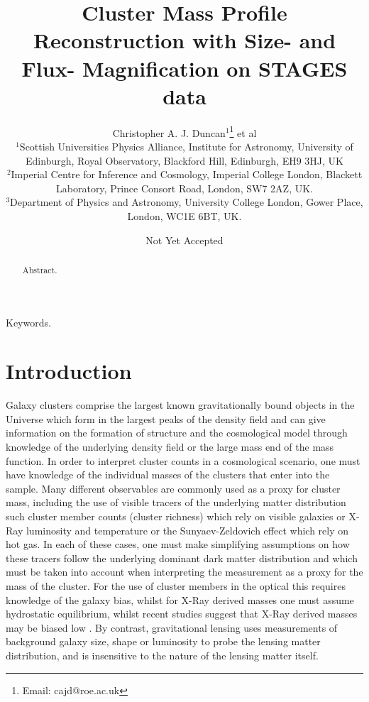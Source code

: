 \documentclass[useAMS,usenatbib,times,letter,amssymb]{mn2e}
\title[Mass profile reconstruction with magnification]{Cluster Mass Profile Reconstruction with Size- and Flux- Magnification on STAGES data}
\author[C. Duncan et al.]{Christopher A. J. Duncan$^{1}$\thanks{Email: cajd@roe.ac.uk} et al\\%
$^{1}$Scottish Universities Physics Alliance, Institute for Astronomy, University of Edinburgh, Royal Observatory, Blackford Hill, Edinburgh, EH9 3HJ, UK\\
$^{2}$Imperial Centre for Inference and Cosmology, Imperial College London, Blackett Laboratory, Prince Consort Road, London, SW7 2AZ, UK.\\
$^{3}$Department of Physics and Astronomy, University College London, Gower Place, London, WC1E 6BT, UK.}
\begin{document}
\date{Not Yet Accepted}

\pagerange{\pageref{firstpage}--\pageref{lastpage}} 

\maketitle

\label{firstpage}

\begin{abstract}
Abstract.
\end{abstract}

\begin{keywords}
Keywords.
\end{keywords}

\section{Introduction}

Galaxy clusters comprise the largest known gravitationally bound objects in the Universe which form in the largest peaks of the density field and can give information on the formation of structure and the cosmological model through knowledge of the underlying density field or the large mass end of the mass function. In order to interpret cluster counts in a cosmological scenario, one must have knowledge of the individual masses of the clusters that enter into the sample. Many different observables are commonly used as a proxy for cluster mass, including the use of visible tracers of the underlying matter distribution such cluster member counts (cluster richness) which rely on visible galaxies or X-Ray luminosity and temperature or the Sunyaev-Zeldovich effect which rely on hot gas. In each of these cases, one must make simplifying assumptions on how these tracers follow the underlying dominant dark matter distribution and which must be taken into account when interpreting the measurement as a proxy for the mass of the cluster. For the use of cluster members in the optical this requires knowledge of the galaxy bias, whilst for X-Ray derived masses one must assume hydrostatic equilibrium, whilst recent studies suggest that X-Ray derived masses may be biased low \citep{Simet:2015p2852}. By contrast, gravitational lensing uses measurements of background galaxy size, shape or luminosity to probe the lensing matter distribution, and is insensitive to the nature of the lensing matter itself.
\end{document}

